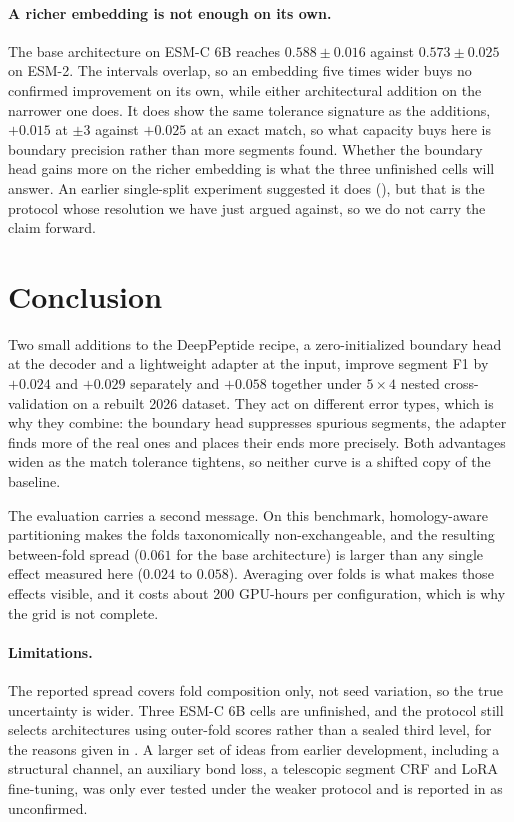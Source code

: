 \documentclass{article}
\begin{document}
\paragraph{A richer embedding is not enough on its own.} The base architecture on ESM-C 6B reaches $0.588\pm0.016$ against $0.573\pm0.025$ on ESM-2. The intervals overlap, so an embedding five times wider buys no confirmed improvement on its own, while either architectural addition on the narrower one does. It does show the same tolerance signature as the additions, $+0.015$ at $\pm3$ against $+0.025$ at an exact match, so what capacity buys here is boundary precision rather than more segments found. Whether the boundary head gains more on the richer embedding is what the three unfinished cells will answer. An earlier single-split experiment suggested it does (), but that is the protocol whose resolution we have just argued against, so we do not carry the claim forward.

\section{Conclusion}
\label{sec:conclusion}

Two small additions to the DeepPeptide recipe, a zero-initialized boundary head at the decoder and a lightweight adapter at the input, improve segment F1 by $+0.024$ and $+0.029$ separately and $+0.058$ together under $5\times4$ nested cross-validation on a rebuilt 2026 dataset. They act on different error types, which is why they combine: the boundary head suppresses spurious segments, the adapter finds more of the real ones and places their ends more precisely. Both advantages widen as the match tolerance tightens, so neither curve is a shifted copy of the baseline.

The evaluation carries a second message. On this benchmark, homology-aware partitioning makes the folds taxonomically non-exchangeable, and the resulting between-fold spread ($0.061$ for the base architecture) is larger than any single effect measured here ($0.024$ to $0.058$). Averaging over folds is what makes those effects visible, and it costs about 200 GPU-hours per configuration, which is why the grid is not complete.

\paragraph{Limitations.} The reported spread covers fold composition only, not seed variation, so the true uncertainty is wider. Three ESM-C 6B cells are unfinished, and the protocol still selects architectures using outer-fold scores rather than a sealed third level, for the reasons given in . A larger set of ideas from earlier development, including a structural channel, an auxiliary bond loss, a telescopic segment CRF and LoRA fine-tuning, was only ever tested under the weaker protocol and is reported in  as unconfirmed.
\end{document}
